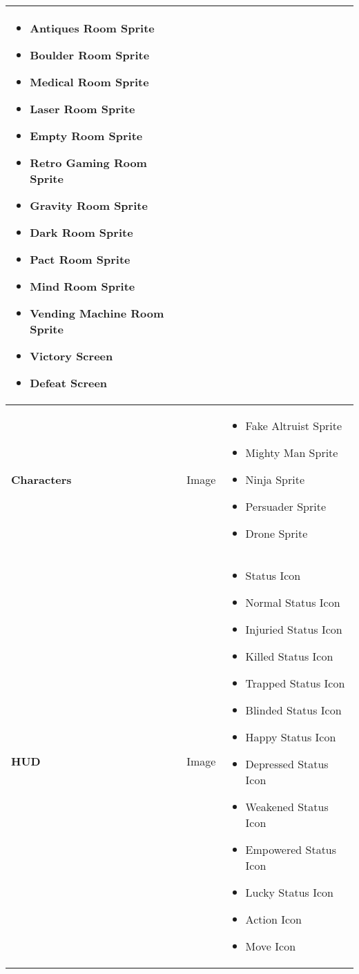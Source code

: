 \begin{tabular}{|m{3cm}|m{3cm}|m{7cm}|}
\begin{itemize}
     	\item Antiques Room Sprite
     	\item Boulder Room Sprite
     	\item Medical Room Sprite
     	\item Laser Room Sprite
     	\item Empty Room Sprite
     	\item Retro Gaming Room Sprite
     	\item Gravity Room Sprite
     	\item Dark Room Sprite
     	\item Pact Room Sprite
     	\item Mind Room Sprite
     	\item Vending Machine Room Sprite
     	\item Victory Screen
     	\item Defeat Screen
     \end{itemize}
     \\
     \hline
     \textbf{Characters}& Image & 
     \begin{itemize}
     	\item Fake Altruist Sprite
     	\item Mighty Man Sprite
     	\item Ninja Sprite
     	\item Persuader Sprite
     	\item Drone Sprite
     \end{itemize}
     \\
     \hline
     \textbf{HUD}& Image & 
     \begin{itemize}
     	\item Status Icon
     	\item Normal Status Icon
     	\item Injuried Status Icon
     	\item Killed Status Icon
     	\item Trapped Status Icon
     	\item Blinded Status Icon
     	\item Happy Status Icon
     	\item Depressed Status Icon
     	\item Weakened Status Icon
     	\item Empowered Status Icon
     	\item Lucky Status Icon
     	\item Action Icon
     	\item Move Icon

\end{itemize}
\end{tabular}
